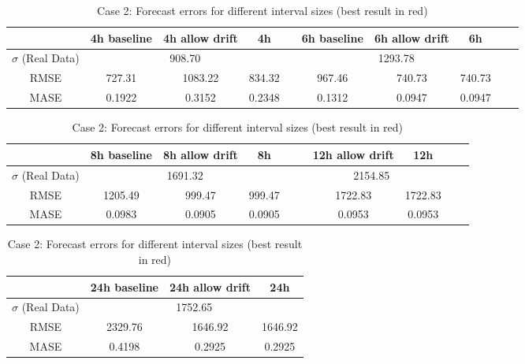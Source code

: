 \begin{table}[!ht]
\footnotesize
\begin{tabular}{c|ccccccccc}
              & 4h baseline & 4h allow drift & 4h     &  & 6h baseline & 6h allow drift & 6h     &  &  \\ \hline
$\sigma$ (Real Data) & \multicolumn{3}{c}{908.70}           &  & \multicolumn{3}{c}{1293.78}           &  &  \\
RMSE          & 727.31      & 1083.22        & 834.32 &  & 967.46      & 740.73         & 740.73 &  &  \\
MASE          & 0.1922      & 0.3152         & 0.2348 &  & 0.1312      & 0.0947         & 0.0947 &  & 
\end{tabular}

\vspace{0.5cm}

\begin{tabular}{c|ccccccccc}
              & 8h baseline & 8h allow drift & 8h     &  & \color{red}{12h baseline} & 12h
              allow drift & 12h     &  &  \\ \hline
$\sigma$ (Real Data) & \multicolumn{3}{c}{1691.32}           &  & \multicolumn{3}{c}{2154.85}           &  &  \\
RMSE          & 1205.49      & 999.47        & 999.47 &  & \color{red}{1565.43}    & 1722.83        & 1722.83 &  &  \\
MASE          & 0.0983      & 0.0905         & 0.0905 &  & \color{red}{0.0857}     & 0.0953         & 0.0953 &  & 
\end{tabular}

\vspace{0.5cm}

\begin{tabular}{c|ccc}
              & 24h baseline & 24h allow drift & 24h  \\ \hline
$\sigma$ (Real Data) & \multicolumn{3}{c}{1752.65}     \\
RMSE          & 2329.76     & 1646.92         & 1646.92   \\
MASE          & 0.4198      & 0.2925         & 0.2925 \\
\end{tabular}

\vspace{0.5cm}

\caption{Case 2: Forecast errors for different interval sizes (best result in
red)}\label{tab:case2_interval}
\end{table}


